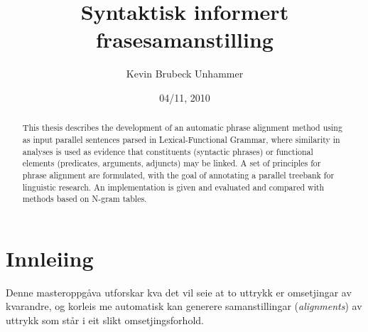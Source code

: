 \documentclass[11pt,a4paper,oneside,draft]{report}
\title{Syntaktisk informert frasesamanstilling }
\author{Kevin Brubeck Unhammer}
\date{04/11, 2010}
\begin{document}
\maketitle

\setcounter{tocdepth}{4}
\tableofcontents
\vspace*{1cm}

 
\begin{abstract}
\noindent


This thesis describes the development of an automatic phrase alignment
 method using as input parallel sentences parsed in Lexical-Functional
 Grammar, where similarity in analyses is used as evidence that
 constituents (syntactic phrases) or functional elements (predicates,
 arguments, adjuncts) may be linked. A set of principles for phrase
 alignment are formulated, with the goal of annotating a parallel
 treebank for linguistic research.  An implementation is given and
 evaluated and compared with methods based on N-gram tables.

\end{abstract}



\chapter{Innleiing}
\label{sec-1}

\label{SEC:innleiing}



Denne masteroppgåva utforskar kva det vil seie at to uttrykk er
omsetjingar av kvarandre, og korleis me automatisk kan generere
samanstillingar (\emph{alignments}) av uttrykk som står i eit slikt
omsetjingsforhold.
\end{document}
